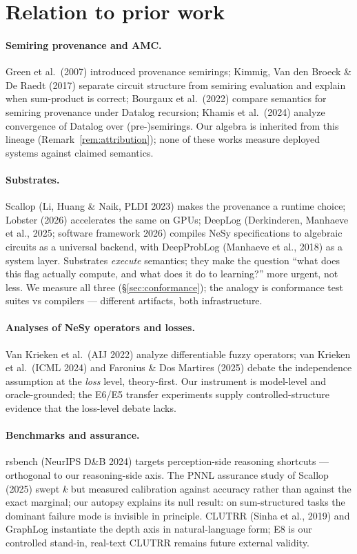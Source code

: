 \documentclass[10pt]{article}
\theoremstyle{remark}
\begin{document}
\section{Relation to prior work}\label{sec:related}

\paragraph{Semiring provenance and AMC.} Green et al.\ (2007) introduced provenance semirings;
Kimmig, Van den Broeck \& De Raedt (2017) separate circuit structure from semiring evaluation and
explain when sum-product is correct; Bourgaux et al.\ (2022) compare semantics for semiring
provenance under Datalog recursion; Khamis et al.\ (2024) analyze convergence of Datalog over
(pre-)semirings. Our algebra is inherited from this lineage (Remark~\ref{rem:attribution}); none
of these works measure deployed systems against claimed semantics.

\paragraph{Substrates.} Scallop (Li, Huang \& Naik, PLDI 2023) makes the provenance a runtime
choice; Lobster (2026) accelerates the same on GPUs; DeepLog (Derkinderen, Manhaeve et al., 2025;
software framework 2026) compiles NeSy specifications to algebraic circuits as a universal
backend, with DeepProbLog (Manhaeve et al., 2018) as a system layer. Substrates \emph{execute}
semantics; they make the question ``what does this flag actually compute, and what does it do to
learning?'' more urgent, not less. We measure all three (\S\ref{sec:conformance}); the analogy is
conformance test suites vs compilers --- different artifacts, both infrastructure.

\paragraph{Analyses of NeSy operators and losses.} Van Krieken et al.\ (AIJ 2022) analyze
differentiable fuzzy operators; van Krieken et al.\ (ICML 2024) and Faronius \& Dos Martires
(2025) debate the independence assumption at the \emph{loss} level, theory-first. Our instrument
is model-level and oracle-grounded; the E6/E5 transfer experiments supply controlled-structure
evidence that the loss-level debate lacks.

\paragraph{Benchmarks and assurance.} rsbench (NeurIPS D\&B 2024) targets perception-side
reasoning shortcuts --- orthogonal to our reasoning-side axis. The PNNL assurance study of Scallop
(2025) swept $k$ but measured calibration against accuracy rather than against the exact
marginal; our autopsy explains its null result: on sum-structured tasks the dominant failure mode
is invisible in principle. CLUTRR (Sinha et al., 2019) and GraphLog instantiate the depth axis in
natural-language form; E8 is our controlled stand-in, real-text CLUTRR remains future external
validity.
\end{document}
